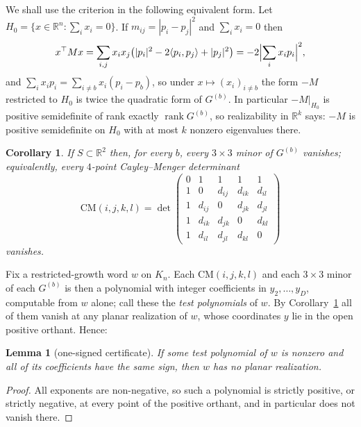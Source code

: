 \documentclass[11pt]{amsart}
\numberwithin{theorem}{section}
\newtheorem{lemma}[theorem]{Lemma}
\newtheorem{corollary}[theorem]{Corollary}
\theoremstyle{remark}
\theoremstyle{definition}
\DeclareMathOperator{\rank}{rank}
\begin{document}
We shall use the criterion in the following equivalent form. Let
$H_0=\{x\in\mathbb R^n:\sum_ix_i=0\}$. If $m_{ij}=|p_i-p_j|^2$ and
$\sum_ix_i=0$ then
\[
  x^\top Mx=\sum_{i,j}x_ix_j\bigl(|p_i|^2-2\langle p_i,p_j\rangle+|p_j|^2\bigr)
  =-2\Bigl|\sum_i x_ip_i\Bigr|^2 ,
\]
and $\sum_ix_ip_i=\sum_{i\ne b}x_i(p_i-p_b)$, so under
$x\mapsto(x_i)_{i\ne b}$ the form $-M$ restricted to $H_0$ is twice the
quadratic form of $G^{(b)}$. In particular $-M|_{H_0}$ is positive semidefinite
of rank exactly $\rank G^{(b)}$, so realizability in $\mathbb R^k$ says: $-M$ is
positive semidefinite on $H_0$ with at most $k$ nonzero eigenvalues there.

\begin{corollary}\label{cor:minors}
If $S\subset\mathbb R^2$ then, for every $b$, every $3\times3$ minor of
$G^{(b)}$ vanishes; equivalently, every $4$-point Cayley--Menger determinant
\[
  \mathrm{CM}(i,j,k,l)=
  \det\begin{pmatrix}
    0&1&1&1&1\\ 1&0&d_{ij}&d_{ik}&d_{il}\\
    1&d_{ij}&0&d_{jk}&d_{jl}\\ 1&d_{ik}&d_{jk}&0&d_{kl}\\
    1&d_{il}&d_{jl}&d_{kl}&0
  \end{pmatrix}
\]
vanishes.
\end{corollary}

Fix a restricted-growth word $w$ on $K_n$. Each $\mathrm{CM}(i,j,k,l)$ and each
$3\times3$ minor of each $G^{(b)}$ is then a polynomial with integer
coefficients in $y_2,\dots,y_D$, computable from $w$ alone; call these the
\emph{test polynomials} of $w$. By Corollary~\ref{cor:minors} all of them
vanish at any planar realization of $w$, whose coordinates $y$ lie in the open
positive orthant. Hence:

\begin{lemma}[one-signed certificate]\label{lem:onesigned}
If some test polynomial of $w$ is nonzero and all of its coefficients have the
same sign, then $w$ has no planar realization.
\end{lemma}

\begin{proof}
All exponents are non-negative, so such a polynomial is strictly positive, or
strictly negative, at every point of the positive orthant, and in particular
does not vanish there.
\end{proof}
\end{document}
